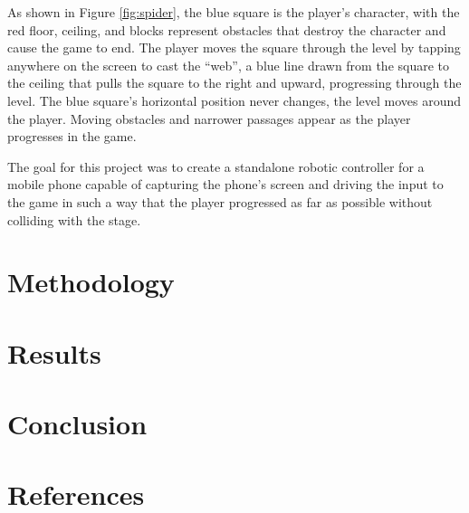 \documentclass[twocolumn,a4paper,12pt]{article}
\begin{document}
As shown in Figure \ref{fig:spider}, the blue square is the player's character,
with the red floor, ceiling, and blocks represent obstacles that destroy the
character and cause the game to end. The player moves the square through the
level by tapping anywhere on the screen to cast the ``web'', a blue line drawn
from the square to the ceiling that pulls the square to the right and upward,
progressing through the level. The blue square's horizontal position never
changes, the level moves around the player. Moving obstacles and narrower
passages appear as the player progresses in the game.

The goal for this project was to create a standalone robotic controller for a
mobile phone capable of capturing the phone's screen and driving the input to
the game in such a way that the player progressed as far as possible without
colliding with the stage.

\section{Methodology}

\section{Results}

\section{Conclusion}

\section{References}
\end{document}
